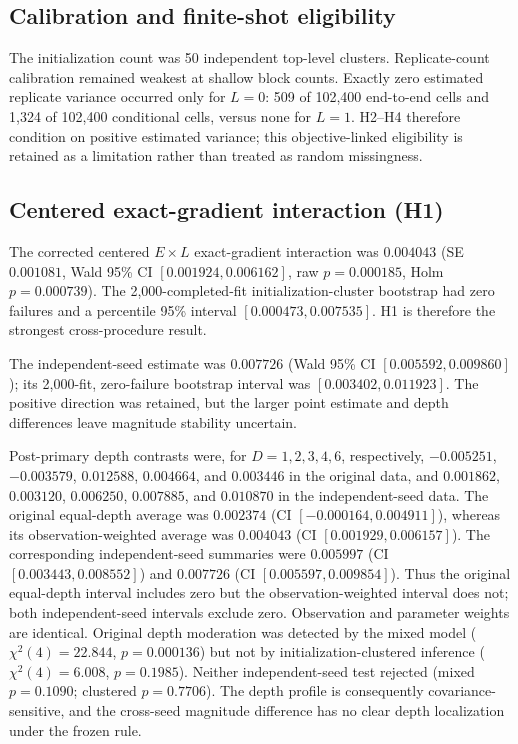 \documentclass[pdflatex,sn-basic,Numbered]{sn-jnl}
\begin{document}
\subsection{Calibration and finite-shot eligibility}\label{sec:results-calibration}\label{sec:zero-variance-sensitivity}

The initialization count was 50 independent top-level clusters. Replicate-count calibration remained weakest at shallow block counts. Exactly zero estimated replicate variance occurred only for $L=0$: 509 of 102,400 end-to-end cells and 1,324 of 102,400 conditional cells, versus none for $L=1$. H2--H4 therefore condition on positive estimated variance; this objective-linked eligibility is retained as a limitation rather than treated as random missingness.

\subsection{Centered exact-gradient interaction (H1)}\label{sec:h1-result}

The corrected centered $E\times L$ exact-gradient interaction was $0.004043$ (SE $0.001081$, Wald 95\% CI $[0.001924,0.006162]$, raw $p=0.000185$, Holm $p=0.000739$). The 2,000-completed-fit initialization-cluster bootstrap had zero failures and a percentile 95\% interval $[0.000473,0.007535]$. H1 is therefore the strongest cross-procedure result.

The independent-seed estimate was $0.007726$ (Wald 95\% CI $[0.005592,0.009860]$); its 2,000-fit, zero-failure bootstrap interval was $[0.003402,0.011923]$. The positive direction was retained, but the larger point estimate and depth differences leave magnitude stability uncertain.

Post-primary depth contrasts were, for $D=1,2,3,4,6$, respectively, $-0.005251$, $-0.003579$, $0.012588$, $0.004664$, and $0.003446$ in the original data, and $0.001862$, $0.003120$, $0.006250$, $0.007885$, and $0.010870$ in the independent-seed data. The original equal-depth average was $0.002374$ (CI $[-0.000164,0.004911]$), whereas its observation-weighted average was $0.004043$ (CI $[0.001929,0.006157]$). The corresponding independent-seed summaries were $0.005997$ (CI $[0.003443,0.008552]$) and $0.007726$ (CI $[0.005597,0.009854]$). Thus the original equal-depth interval includes zero but the observation-weighted interval does not; both independent-seed intervals exclude zero. Observation and parameter weights are identical. Original depth moderation was detected by the mixed model ($\chi^2(4)=22.844$, $p=0.000136$) but not by initialization-clustered inference ($\chi^2(4)=6.008$, $p=0.1985$). Neither independent-seed test rejected (mixed $p=0.1090$; clustered $p=0.7706$). The depth profile is consequently covariance-sensitive, and the cross-seed magnitude difference has no clear depth localization under the frozen rule.
\end{document}

